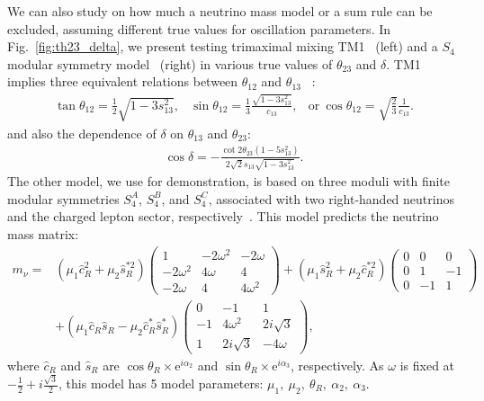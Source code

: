 \documentclass[aps,prd,nofootinbib,preprint]{revtex4}
\begin{document}
{\color{blue}We can also study on how much a neutrino mass model  or a sum rule can be excluded, assuming different true values for oscillation parameters.}
In Fig.~\ref{fig:th23_delta}, we present testing {\color{blue}trimaximal mixing TM1~\cite{Albright:2008rp} (left) and a $S_4$ modular symmetry model~\cite{deMedeirosVarzielas:2019cyj} (right) in various true values of $\theta_{23}$ and $\delta$. TM1 implies three equivalent relations between $\theta_{12}$ and $\theta_{13}$~\cite{Albright:2008rp} :
\begin{eqnarray}\label{eq:TM1}
\tan\theta_{12}=\frac{1}{2}\sqrt{1-3s^2_{13}},&\sin\theta_{12}=\frac{1}{3}\frac{\sqrt{1-3s_{13}^2}}{c_13},&\text{or}~\cos\theta_{12}=\sqrt{\frac{2}{3}}\frac{1}{c_{13}}.
\end{eqnarray}
and also the dependence of $\delta$ on $\theta_{13}$ and $\theta_{23}$:
\begin{eqnarray}\label{eq:TM1_dCP}
\cos\delta=-\frac{\cot 2\theta_{23}(1-5s_{13}^2)}{2\sqrt{2}s_{13}\sqrt{1-3s_{13}^2}}.
\end{eqnarray}
The other model, we use for demonstration, is based on three moduli with finite modular symmetries $S_4^A$, $S_4^B$, and $S_4^C$, associated with two right-handed neutrinos and the charged lepton sector, respectively~\cite{deMedeirosVarzielas:2019cyj}. This model predicts the neutrino mass matrix: 
\begin{eqnarray}
m_\nu=&(\mu_1\hat{c}_R^2+\mu_2\hat{s}_R^{*2})\left(
\begin{array}{ccc}
1& -2\omega^2& -2\omega\\
-2\omega^2&4\omega&4\\
-2\omega&4&4\omega^2
\end{array}
\right)+
(\mu_1\hat{s}^2_R+\mu_2\hat{c}_R^{*2})\left(
\begin{array}{ccc}
0& 0& 0\\
0&1&-1\\
0&-1&1
\end{array}
\right) \nonumber \\
&+(\mu_1\hat{c}_R\hat{s}_R-\mu_2\hat{c}^*_R\hat{s}_R^*)\left(
\begin{array}{ccc}
0& -1& 1\\
-1&4\omega^2&2i\sqrt{3}\\
1&2i\sqrt{3}&-4\omega
\end{array}
\right),
\end{eqnarray}
where $\hat{c}_R$ and $\hat{s}_R$ are $\cos\theta_R\times \mathrm{e}^{i\alpha_2}$ and $\sin\theta_R\times \mathrm{e}^{i\alpha_3}$, respectively. As $\omega$ is fixed at $-\frac{1}{2}+i\frac{\sqrt{3}}{2}$, this model has 5 model parameters: $\mu_1,~\mu_2,~\theta_R,~\alpha_2,~\alpha_3$.
}
\end{document}
